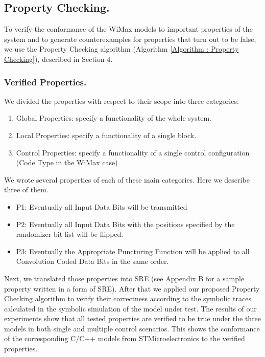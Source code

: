 \documentclass[submission,copyright,creativecommons]{eptcs}
\begin{document}
\subsection{Property Checking.}
To verify the conformance of the WiMax models to important properties of the system and to generate counterexamples for properties that turn out to be false, we use the Property Checking algorithm (Algorithm \ref{Algorithm : Property Checking}), described in Section 4.

\subsubsection{Verified Properties.}

We divided the properties with respect to their scope into three categories: \begin{enumerate}
  \item Global Properties: specify a functionality of the whole system.
  \item Local Properties: specify a functionality of a single block.
  \item Control Properties: specify a functionality of a single control configuration (Code Type in the WiMax case)
\end{enumerate}
We wrote several properties of each of these main categories. Here we describe three of them. \begin{itemize}
  \item P1: Eventually all Input Data Bits will be transmitted
  \item P2: Eventually all Input Data Bits with the positions specified by the randomizer bit list will be flipped.
  \item P3: Eventually the Appropriate Puncturing Function will be applied to all Convolution Coded Data Bits in the same order.
\end{itemize}
Next, we translated those properties into SRE (see Appendix B for a sample property written in a form of SRE). After that we applied our proposed Property Checking algorithm to verify their correctness according to the symbolic traces calculated in the symbolic simulation of the model under test. The results of our experiments show that all tested properties are verified to be true under the three models in both single and multiple control scenarios. This shows the conformance of the corresponding C/C++ models from STMicroelectronics to the verified properties.
\end{document}
